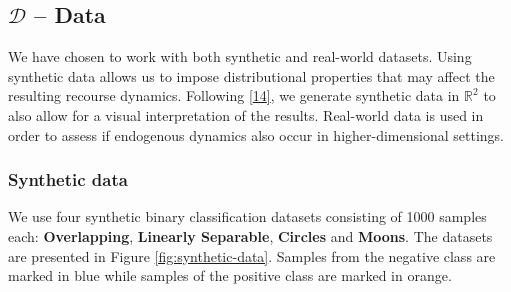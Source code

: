 \documentclass[conference,final,]{IEEEtran}
\theoremstyle{definition}
\theoremstyle{definition}
\theoremstyle{definition}
\theoremstyle{definition}
\theoremstyle{remark}
\begin{document}
\begin{table}

\caption{\label{tab:architecture}Neural network architectures and training parameters.}
\centering
{}
\end{table}

\hypertarget{empirical-data}{%
\subsection{\texorpdfstring{\(\mathcal{D}\) -- Data}{\textbackslash mathcal\{D\} -- Data}}\label{empirical-data}}

We have chosen to work with both synthetic and real-world datasets. Using synthetic data allows us to impose distributional properties that may affect the resulting recourse dynamics. Following \protect\hyperlink{ref-upadhyay2021towards}{{[}14{]}}, we generate synthetic data in \(\mathbb{R}^2\) to also allow for a visual interpretation of the results. Real-world data is used in order to assess if endogenous dynamics also occur in higher-dimensional settings.

\hypertarget{synthetic-data}{%
\subsubsection{Synthetic data}\label{synthetic-data}}

We use four synthetic binary classification datasets consisting of 1000 samples each: \textbf{Overlapping}, \textbf{Linearly Separable}, \textbf{Circles} and \textbf{Moons}. The datasets are presented in Figure \ref{fig:synthetic-data}. Samples from the negative class are marked in blue while samples of the positive class are marked in orange.
\end{document}
